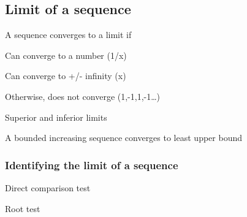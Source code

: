 
\subsection{Limit of a sequence}

A sequence converges to a limit if

Can converge to a number (1/x)

Can converge to +/- infinity (x)

Otherwise, does not converge (1,-1,1,-1…)

Superior and inferior limits

A bounded increasing sequence converges to least upper bound

\subsubsection{Identifying the limit of a sequence}

Direct comparison test

Root test

